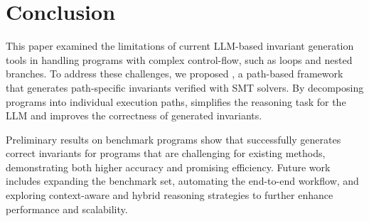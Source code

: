 \section{Conclusion}

This paper examined the limitations of current LLM-based invariant generation tools in handling programs with complex control-flow, such as loops and nested branches. To address these challenges, we proposed \thistool{}, a path-based framework that generates path-specific invariants verified with SMT solvers. By decomposing programs into individual execution paths, \thistool{} simplifies the reasoning task for the LLM and improves the correctness of generated invariants.

Preliminary results on benchmark programs show that \thistool{} successfully generates correct invariants for programs that are challenging for existing methods, demonstrating both higher accuracy and promising efficiency. Future work includes expanding the benchmark set, automating the end-to-end workflow, and exploring context-aware and hybrid reasoning strategies to further enhance performance and scalability.
